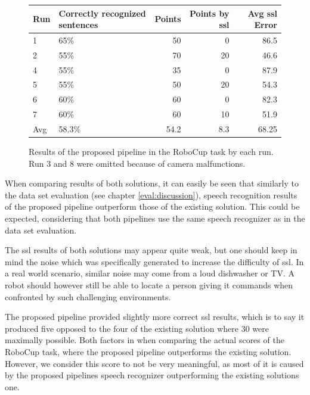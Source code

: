 \begin{figure}[ht]
	\begin{tabular}{ | l | p{3.5cm} | r | r | r |}
		\hline
		Run & Correctly recognized sentences & Points & Points by \gls{ssl} & Avg \gls{ssl} Error \\ \hline
		1 & 65\% & 50 &  0 & 86.5\\ \hline
		2 & 55\% & 70 & 20 & 46.6\\ \hline
		4 & 55\% & 35 &  0 & 87.9\\ \hline
		5 & 55\% & 50 & 20 & 54.3\\ \hline
		6 & 60\% & 60 &  0 & 82.3\\ \hline
		7 & 60\% & 60 & 10 & 51.9\\ \hhline{|=|=|=|=|=|}
		Avg & 58.3\% & 54.2 & 8.3 & 68.25\\
		\hline
	\end{tabular}
	\caption{Results of the proposed pipeline in the RoboCup task by each run.
		Run 3 and 8 were omitted because of camera malfunctions.}
	\label{table:eval_task_results_new}
\end{figure}

When comparing results of both solutions, it can easily be seen that similarly to the data set evaluation (see chapter \ref{eval:discussion}), speech recognition results of the proposed pipeline outperform those of the existing solution.
This could be expected, considering that both pipelines use the same speech recognizer as in the data set evaluation.

The \gls{ssl} results of both solutions may appear quite weak, but one should keep in mind the noise which was specifically generated to increase the difficulty of \gls{ssl}.
In a real world scenario, similar noise may come from a loud dishwasher or TV.
A robot should however still be able to locate a person giving it commands when confronted by such challenging environments.

The proposed pipeline provided slightly more correct \gls{ssl} results, which is to say it produced five opposed to the four of the existing solution where 30 were maximally possible.
Both factors in when comparing the actual scores of the RoboCup task, where the proposed pipeline outperforms the existing solution.
However, we consider this score to not be very meaningful, as most of it is caused by the proposed pipelines speech recognizer outperforming the existing solutions one.


